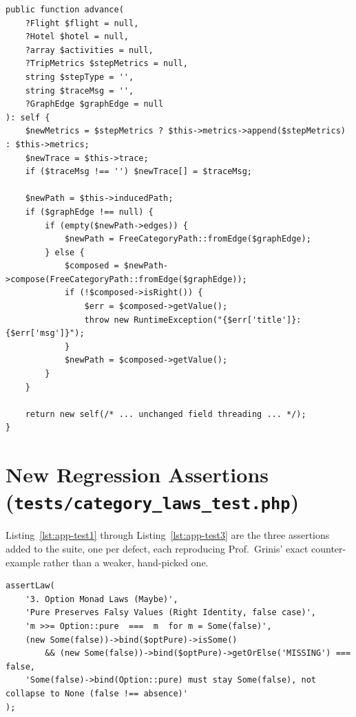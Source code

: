\begin{lstlisting}[caption={\texttt{Itinerary::advance()} -- fixed, propagates composition failure},label={lst:app-advance},firstnumber=348]
public function advance(
    ?Flight $flight = null,
    ?Hotel $hotel = null,
    ?array $activities = null,
    ?TripMetrics $stepMetrics = null,
    string $stepType = '',
    string $traceMsg = '',
    ?GraphEdge $graphEdge = null
): self {
    $newMetrics = $stepMetrics ? $this->metrics->append($stepMetrics) : $this->metrics;
    $newTrace = $this->trace;
    if ($traceMsg !== '') $newTrace[] = $traceMsg;

    $newPath = $this->inducedPath;
    if ($graphEdge !== null) {
        if (empty($newPath->edges)) {
            $newPath = FreeCategoryPath::fromEdge($graphEdge);
        } else {
            $composed = $newPath->compose(FreeCategoryPath::fromEdge($graphEdge));
            if (!$composed->isRight()) {
                $err = $composed->getValue();
                throw new RuntimeException("{$err['title']}: {$err['msg']}");
            }
            $newPath = $composed->getValue();
        }
    }

    return new self(/* ... unchanged field threading ... */);
}
\end{lstlisting}

\section{New Regression Assertions (\texttt{tests/category\_laws\_test.php})}\label{app:tests}

Listing~\ref{lst:app-test1} through Listing~\ref{lst:app-test3} are the three assertions added to the suite, one per defect, each reproducing Prof.~Grinis' exact counter-example rather than a weaker, hand-picked one.

\begin{lstlisting}[caption={Regression for the \texttt{Option::pure(false)} defect},label={lst:app-test1},firstnumber=99]
assertLaw(
    '3. Option Monad Laws (Maybe)',
    'Pure Preserves Falsy Values (Right Identity, false case)',
    'm >>= Option::pure  ===  m  for m = Some(false)',
    (new Some(false))->bind($optPure)->isSome()
        && (new Some(false))->bind($optPure)->getOrElse('MISSING') === false,
    'Some(false)->bind(Option::pure) must stay Some(false), not collapse to None (false !== absence)'
);
\end{lstlisting}

